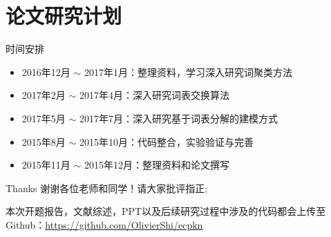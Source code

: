 \documentclass[14pt]{Bredelebeamer}
\begin{document}
\section{论文研究计划}
\begin{frame}{时间安排}
	\begin{block}{}
\begin{itemize}
  \item 2016年12月 $\sim$ 2017年1月：整理资料，学习深入研究词聚类方法
  \item 2017年2月 $\sim$ 2017年4月：深入研究词表交换算法
  \item 2017年5月 $\sim$ 2017年7月：深入研究基于词表分解的建模方式
  \item 2015年8月 $\sim$ 2015年10月：代码整合，实验验证与完善
  \item 2015年11月 $\sim$ 2015年12月：整理资料和论文撰写
\end{itemize}
    \end{block}
\end{frame}


\begin{frame}{Thanks}
	\centering
    谢谢各位老师和同学！请大家批评指正;

	本次开题报告，文献综述，PPT以及后续研究过程中涉及的代码都会上传至Github：\url{https://github.com/OlivierShi/ecpkn}
	
\end{frame}
\end{document}
